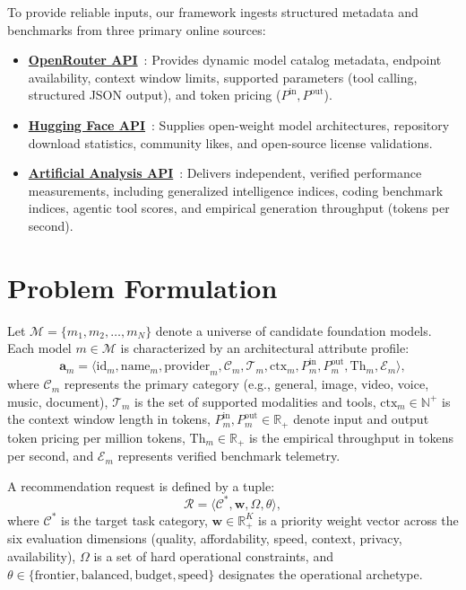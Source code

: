 \documentclass[pdflatex,sn-mathphys-num]{sn-jnl}
\theoremstyle{thmstyleone}
\theoremstyle{thmstylethree}
\begin{document}
To provide reliable inputs, our framework ingests structured metadata and benchmarks from three primary online sources:
\begin{itemize}
  \item \textbf{\href{https://openrouter.ai/docs/api-reference/overview}{OpenRouter API}}~\cite{openrouter2024}: Provides dynamic model catalog metadata, endpoint availability, context window limits, supported parameters (tool calling, structured JSON output), and token pricing ($P^{\text{in}}, P^{\text{out}}$).
  \item \textbf{\href{https://huggingface.co/docs/hub/api}{Hugging Face API}}~\cite{hf2023}: Supplies open-weight model architectures, repository download statistics, community likes, and open-source license validations.
  \item \textbf{\href{https://artificialanalysis.ai/api-reference}{Artificial Analysis API}}~\cite{aa2024}: Delivers independent, verified performance measurements, including generalized intelligence indices, coding benchmark indices, agentic tool scores, and empirical generation throughput (tokens per second).
\end{itemize}

\section{Problem Formulation}\label{sec:problem}

Let $\mathcal{M} = \{m_1, m_2, \dots, m_N\}$ denote a universe of candidate foundation models. Each model $m \in \mathcal{M}$ is characterized by an architectural attribute profile:
\begin{equation}\label{eq:model_tuple}
\mathbf{a}_m = \langle \text{id}_m, \text{name}_m, \text{provider}_m, \mathcal{C}_m, \mathcal{T}_m, \text{ctx}_m, P_m^{\text{in}}, P_m^{\text{out}}, \text{Th}_m, \mathcal{E}_m \rangle,
\end{equation}
where $\mathcal{C}_m$ represents the primary category (e.g., general, image, video, voice, music, document), $\mathcal{T}_m$ is the set of supported modalities and tools, $\text{ctx}_m \in \mathbb{N}^+$ is the context window length in tokens, $P_m^{\text{in}}, P_m^{\text{out}} \in \mathbb{R}_+$ denote input and output token pricing per million tokens, $\text{Th}_m \in \mathbb{R}_+$ is the empirical throughput in tokens per second, and $\mathcal{E}_m$ represents verified benchmark telemetry.

A recommendation request is defined by a tuple:
\begin{equation}\label{eq:request_tuple}
\mathcal{R} = \langle \mathcal{C}^*, \mathbf{w}, \Omega, \theta \rangle,
\end{equation}
where $\mathcal{C}^*$ is the target task category, $\mathbf{w} \in \mathbb{R}_+^K$ is a priority weight vector across the six evaluation dimensions (quality, affordability, speed, context, privacy, availability), $\Omega$ is a set of hard operational constraints, and $\theta \in \{\text{frontier}, \text{balanced}, \text{budget}, \text{speed}\}$ designates the operational archetype.
\end{document}
